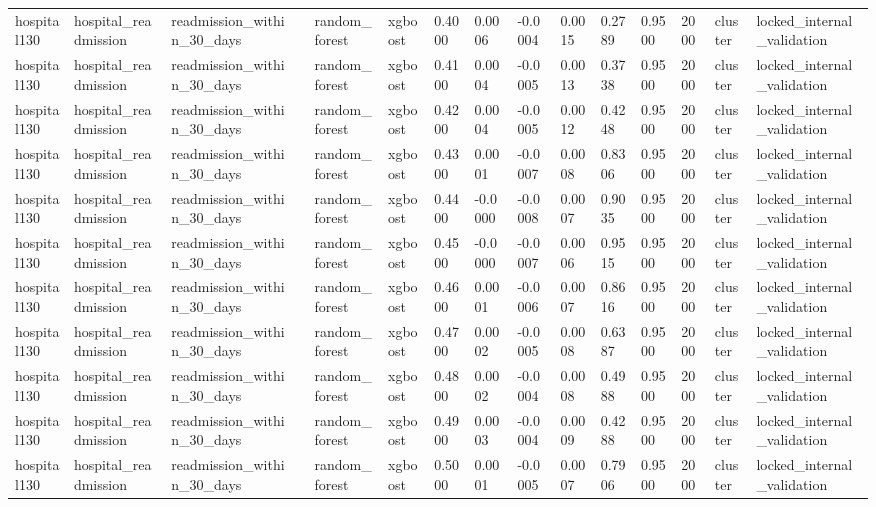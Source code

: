 \begin{tabular}{lllllllllllllll}
hospital130 & hospital\_readmission & readmission\_within\_30\_days &  & random\_forest & xgboost & 0.4000 & 0.0006 & -0.0004 & 0.0015 & 0.2789 & 0.9500 & 2000 & cluster & locked\_internal\_validation \\
hospital130 & hospital\_readmission & readmission\_within\_30\_days &  & random\_forest & xgboost & 0.4100 & 0.0004 & -0.0005 & 0.0013 & 0.3738 & 0.9500 & 2000 & cluster & locked\_internal\_validation \\
hospital130 & hospital\_readmission & readmission\_within\_30\_days &  & random\_forest & xgboost & 0.4200 & 0.0004 & -0.0005 & 0.0012 & 0.4248 & 0.9500 & 2000 & cluster & locked\_internal\_validation \\
hospital130 & hospital\_readmission & readmission\_within\_30\_days &  & random\_forest & xgboost & 0.4300 & 0.0001 & -0.0007 & 0.0008 & 0.8306 & 0.9500 & 2000 & cluster & locked\_internal\_validation \\
hospital130 & hospital\_readmission & readmission\_within\_30\_days &  & random\_forest & xgboost & 0.4400 & -0.0000 & -0.0008 & 0.0007 & 0.9035 & 0.9500 & 2000 & cluster & locked\_internal\_validation \\
hospital130 & hospital\_readmission & readmission\_within\_30\_days &  & random\_forest & xgboost & 0.4500 & -0.0000 & -0.0007 & 0.0006 & 0.9515 & 0.9500 & 2000 & cluster & locked\_internal\_validation \\
hospital130 & hospital\_readmission & readmission\_within\_30\_days &  & random\_forest & xgboost & 0.4600 & 0.0001 & -0.0006 & 0.0007 & 0.8616 & 0.9500 & 2000 & cluster & locked\_internal\_validation \\
hospital130 & hospital\_readmission & readmission\_within\_30\_days &  & random\_forest & xgboost & 0.4700 & 0.0002 & -0.0005 & 0.0008 & 0.6387 & 0.9500 & 2000 & cluster & locked\_internal\_validation \\
hospital130 & hospital\_readmission & readmission\_within\_30\_days &  & random\_forest & xgboost & 0.4800 & 0.0002 & -0.0004 & 0.0008 & 0.4988 & 0.9500 & 2000 & cluster & locked\_internal\_validation \\
hospital130 & hospital\_readmission & readmission\_within\_30\_days &  & random\_forest & xgboost & 0.4900 & 0.0003 & -0.0004 & 0.0009 & 0.4288 & 0.9500 & 2000 & cluster & locked\_internal\_validation \\
hospital130 & hospital\_readmission & readmission\_within\_30\_days &  & random\_forest & xgboost & 0.5000 & 0.0001 & -0.0005 & 0.0007 & 0.7906 & 0.9500 & 2000 & cluster & locked\_internal\_validation \\

\end{tabular}
